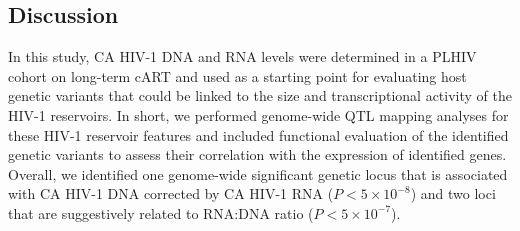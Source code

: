 \documentclass{book}
\begin{document}
\begin{refsection}
\section*{Discussion}

In this study, CA HIV-1 DNA and RNA levels were determined in a PLHIV cohort on long-term cART and used as a starting point for evaluating host genetic variants that could be linked to the size and transcriptional activity of the HIV-1 reservoirs.
In short, we performed genome-wide QTL mapping analyses for these HIV-1 reservoir features and included functional evaluation of the identified genetic variants to assess their correlation with the expression of identified genes.
Overall, we identified one genome-wide significant genetic locus that is associated with CA HIV-1 DNA corrected by CA HIV-1 RNA ($P < 5 \times 10^{-8}$) and two loci that are suggestively related to RNA:DNA ratio ($P < 5 \times 10^{-7}$).


\end{refsection}
\end{document}
